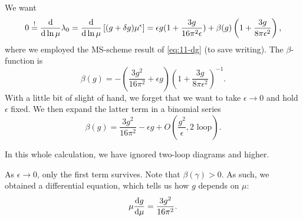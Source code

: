 We want 
\begin{equation}
  0 \stackrel{!}{=} \dv{\ln \mu} \lambda_0 = \dv{\ln \mu} \left[ (g + \delta g) \mu^{\epsilon} \right] 
  = \epsilon g (1 + \frac{3 g}{16 \pi^2 \epsilon}) + \beta(g) \left( 1 + \frac{3 g}{8 \pi \epsilon^2} \right),
\end{equation}
where we employed the MS-scheme result of \eqref{eq:11-dg} (to save writing).
The $\beta$-function is
\begin{equation}
  \beta(g) = - \left( \frac{3 g^2}{16 \pi^2} + \epsilon g \right) \left( 1 + \frac{3 g}{8 \pi \epsilon^2} \right)^{-1}.
\end{equation}
With a little bit of slight of hand, we forget that we want to take $\epsilon \to 0$ and hold $\epsilon$  fixed. We then expand the latter term in a binomial series
\begin{equation}
  \label{eq:11-beta}
  \beta(g) = \frac{3g^2}{16 \pi^2} - \epsilon g + O(\frac{g^2}{\epsilon}, 2 \text{ loop}).
\end{equation}
\begin{remark}
  In this whole calculation, we have ignored two-loop diagrams and higher.
\end{remark}
As $\epsilon \to 0$, only the first term survives.
Note that  $\beta(\gamma) > 0$.
As such, we obtained a differential equation, which tells us how $g$  depends on $\mu$:
 \begin{equation}
  \mu \dv{g}{\mu} = \frac{3 g^2}{16 \pi^2}.
\end{equation}
